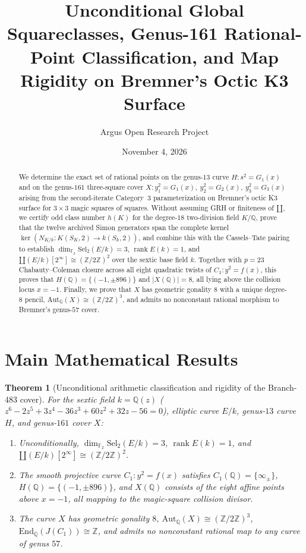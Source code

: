 \documentclass[10pt,reqno]{amsart}
\title[Rational Points and Map Rigidity on a Magic-Square K3 Branch]
{Unconditional Global Squareclasses, Genus-161 Rational-Point Classification, and Map Rigidity on Bremner's Octic K3 Surface}
\author{Argus Open Research Project}
\date{November 4, 2026}
\newtheorem{theorem}{Theorem}[section]
\theoremstyle{definition}
\begin{document}
\begin{abstract}
We determine the exact set of rational points on the genus-$13$ curve $H \colon s^2 = G_1(x)$ and on the genus-$161$ three-square cover $X \colon y_1^2=G_1(x),\ y_2^2=G_2(x),\ y_3^2=G_3(x)$ arising from the second-iterate Category~3 parameterization on Bremner's octic K3 surface for $3\times 3$ magic squares of squares. Without assuming GRH or finiteness of $\amalg$, we certify odd class number $h(K)$ for the degree-$18$ two-division field $K/\mathbb{Q}$, prove that the twelve archived Simon generators span the complete kernel $\ker(N_{K/k} \colon K(S_K,2) \to k(S_k,2))$, and combine this with the Cassels--Tate pairing to establish $\dim_{\mathbb{F}_2}\mathrm{Sel}_2(E/k)=3$, $\operatorname{rank} E(k)=1$, and $\amalg(E/k)[2^\infty] \cong (\mathbb{Z}/2\mathbb{Z})^2$ over the sextic base field $k$. Together with $p=23$ Chabauty--Coleman closure across all eight quadratic twists of $C_1 \colon y^2=f(x)$, this proves that $H(\mathbb{Q}) = \{(-1,\pm 896)\}$ and $|X(\mathbb{Q})|=8$, all lying above the collision locus $x=-1$. Finally, we prove that $X$ has geometric gonality $8$ with a unique degree-$8$ pencil, $\mathrm{Aut}_{\mathbb{Q}}(X) \cong (\mathbb{Z}/2\mathbb{Z})^3$, and admits no nonconstant rational morphism to Bremner's genus-$57$ cover.
\end{abstract}
\maketitle

\section{Main Mathematical Results}
\begin{theorem}[Unconditional arithmetic classification and rigidity of the Branch-483 cover]
For the sextic field $k=\mathbb{Q}(z)$ ($z^6-2z^5+3z^4-36z^3+60z^2+32z-56=0$), elliptic curve $E/k$, genus-$13$ curve $H$, and genus-$161$ cover $X$:
\begin{enumerate}[label=\textup{(\arabic*)}]
  \item Unconditionally, $\dim_{\mathbb{F}_2}\mathrm{Sel}_2(E/k)=3$, $\operatorname{rank} E(k)=1$, and $\amalg(E/k)[2^\infty] \cong (\mathbb{Z}/2\mathbb{Z})^2$.
  \item The smooth projective curve $C_1 \colon y^2=f(x)$ satisfies $C_1(\mathbb{Q})=\{\infty_\pm\}$, $H(\mathbb{Q})=\{(-1,\pm 896)\}$, and $X(\mathbb{Q})$ consists of the eight affine points above $x=-1$, all mapping to the magic-square collision divisor.
  \item The curve $X$ has geometric gonality $8$, $\mathrm{Aut}_{\mathbb{Q}}(X) \cong (\mathbb{Z}/2\mathbb{Z})^3$, $\mathrm{End}_{\overline{\mathbb{Q}}}(J(C_1)) \cong \mathbb{Z}$, and admits no nonconstant rational map to any curve of genus $57$.
\end{enumerate}
\end{theorem}
\end{document}
